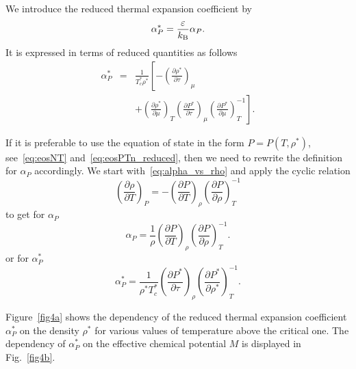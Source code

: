We introduce the reduced thermal expansion coefficient by
\begin{equation}
	\alpha^*_P = \frac{\varepsilon}{k_{\rm B}} \alpha_P.
\end{equation}
It is expressed in terms of reduced quantities as follows
\begin{eqnarray}
	\alpha^*_P & = & \frac{1}{T^*_c \rho^*}
	\left[ 
	-\left(\frac{\partial \rho^*}{\partial \tau}\right)_{\mu}
	\right. \nonumber\\
	&& + \left.\left(\frac{\partial \rho^*}{\partial \mu}\right)_{T}
	\left(\frac{\partial P^*}{\partial \tau}\right)_{\mu}
	\left(\frac{\partial P^*}{\partial \mu}\right)^{-1}_{T} 
	\right].
\end{eqnarray}

If it is preferable to use the equation of state in the form $P=P(T, \rho^*)$, see~\eqref{eq:eosNT} and~\eqref{eq:eosPTn_reduced}, then we need to rewrite the definition for $\alpha_P$ accordingly. We start with~\eqref{eq:alpha_vs_rho} and apply the cyclic relation
\begin{equation}
	\left(\frac{\partial \rho}{\partial T}\right)_P = - \left(\frac{\partial P}{\partial T}\right)_{\rho} \left(\frac{\partial P}{\partial \rho}\right)^{-1}_T
\end{equation}
to get for $\alpha_P$
\begin{equation}
	\alpha_P = \frac{1}{\rho} \left(\frac{\partial P}{\partial T}\right)_{\rho} \left(\frac{\partial P}{\partial \rho}\right)^{-1}_T.
\end{equation}
or for $\alpha^*_P$
\begin{equation}
	\alpha^*_P = \frac{1}{\rho^* T^*_c} \left(\frac{\partial P^*}{\partial \tau}\right)_{\rho} \left(\frac{\partial P^*}{\partial \rho^*}\right)^{-1}_T.
\end{equation}

Figure~\ref{fig4a} shows the dependency of the reduced thermal expansion coefficient $\alpha^*_P$ on the density $\rho^*$ for various values of temperature above the critical one. The dependency of $\alpha^*_P$ on the effective chemical potential $M$ is displayed in Fig.~\ref{fig4b}.

